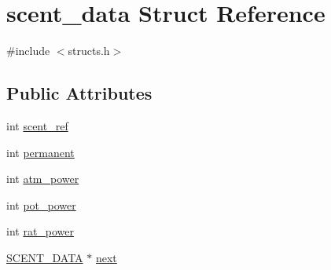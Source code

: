 \hypertarget{structscent__data}{\section{scent\-\_\-data Struct Reference}
\label{structscent__data}
}


{\ttfamily \#include $<$structs.\-h$>$}

\subsection*{Public Attributes}
\begin{DoxyCompactItemize}
\item 
int \hyperlink{structscent__data_a64174fd9dd5bc5edad6de404adde9207}{scent\-\_\-ref}
\item 
int \hyperlink{structscent__data_a1897cb251381c41c2f46e28a2dbf3f01}{permanent}
\item 
int \hyperlink{structscent__data_a7395d0b6e08aae9ab46a58e0d1f4dba9}{atm\-\_\-power}
\item 
int \hyperlink{structscent__data_afed2a2167fee608add589f51afef8652}{pot\-\_\-power}
\item 
int \hyperlink{structscent__data_a6b5bfde0ebc03f7abf2e26a6ffd90ee6}{rat\-\_\-power}
\item 
\hyperlink{structs_8h_a65372345a26d15a29af1abf6cb29f785}{S\-C\-E\-N\-T\-\_\-\-D\-A\-T\-A} $\ast$ \hyperlink{structscent__data_ac5e045f46ad3bb7e8d4554fde2d6d82e}{next}
\end{DoxyCompactItemize}


